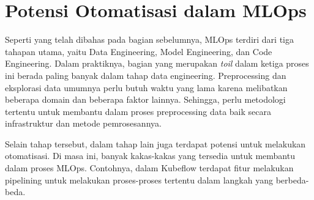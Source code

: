 \section{Potensi Otomatisasi dalam MLOps}

Seperti yang telah dibahas pada bagian sebelumnya, MLOps terdiri dari tiga tahapan utama, yaitu Data Engineering, Model Engineering, dan Code Engineering.
Dalam praktiknya, bagian yang merupakan \textit{toil} dalam ketiga proses ini berada paling banyak dalam tahap data engineering.
Preprocessing dan eksplorasi data umumnya perlu butuh waktu yang lama karena melibatkan beberapa domain dan beberapa faktor lainnya.
Sehingga, perlu metodologi tertentu untuk membantu dalam proses preprocessing data baik secara infrastruktur dan metode pemrosesannya.

Selain tahap tersebut, dalam tahap lain juga terdapat potensi untuk melakukan otomatisasi.
Di masa ini, banyak kakas-kakas yang tersedia untuk membantu dalam proses MLOps.
Contohnya, dalam Kubeflow terdapat fitur melakukan pipelining untuk melakukan proses-proses tertentu dalam langkah yang berbeda-beda.